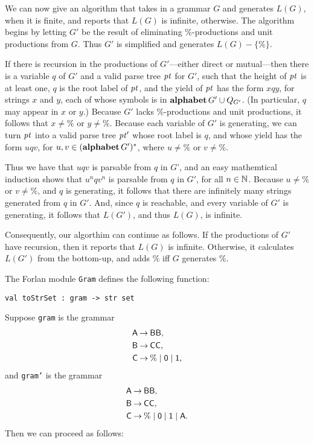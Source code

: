 We can now give an algorithm that takes in a grammar $G$ and generates
$L(G)$, when it is finite, and reports that $L(G)$ is infinite,
otherwise. The algorithm begins by letting $G'$ be the result of
eliminating $\%$-productions and unit productions from $G$. Thus $G'$
is simplified and generates $L(G)-\{\%\}$.

If there is recursion in the productions of $G'$---either direct or
mutual---then there is a variable $q$ of $G'$ and a valid parse tree
${\it pt}$ for $G'$, such that the height of ${\it pt}$ is at least one, $q$ is
the root label of ${\it pt}$, and the yield of ${\it pt}$ has the form $xqy$,
for strings $x$ and $y$, each of whose symbols is in
$\mathbf{alphabet}\,G'\cup Q_{G'}$. (In particular, $q$ may appear in $x$ or
$y$.) Because $G'$ lacks $\%$-productions and unit productions, it
follows that $x\neq\%$ or $y\neq\%$. Because each variable of $G'$ is
generating, we can turn ${\it pt}$ into a valid parse tree ${\it pt}'$ whose
root label is $q$, and whose yield has the form $uqv$, for
$u,v\in(\mathbf{alphabet}\,G')^*$, where $u\neq\%$ or $v\neq\%$.

Thus we have that $uqv$ is parsable from $q$ in $G$', and an easy
mathemtical induction shows that $u^nqv^n$ is parsable from $q$ in
$G'$, for all $n\in\mathbb{N}$.  Because $u\neq\%$ or $v\neq\%$, and $q$ is
generating, it follows that there are infinitely many strings
generated from $q$ in $G'$. And, since $q$ is reachable, and every
variable of $G'$ is generating, it follows that $L(G')$, and thus
$L(G)$, is infinite.

Consequently, our algorthim can continue as follows. If the
productions of $G'$ have recursion, then it reports that $L(G)$ is
infinite.  Otherwise, it calculates $L(G')$ from the bottom-up, and
adds $\%$ iff $G$ generates $\%$.

The Forlan module \texttt{Gram} defines the following function:
\begin{verbatim}
val toStrSet : gram -> str set
\end{verbatim}
Suppose \texttt{gram} is the grammar
\begin{align*}
\mathsf{A} &\mathbin{\to} \mathsf{BB}, \\
\mathsf{B} &\mathbin{\to} \mathsf{CC}, \\
\mathsf{C} &\mathbin{\to} \% \mid \mathsf{0} \mid \mathsf{1} ,
\end{align*}
and
\texttt{gram'} is the grammar
\begin{align*}
\mathsf{A} &\mathbin{\to} \mathsf{BB}, \\
\mathsf{B} &\mathbin{\to} \mathsf{CC}, \\
\mathsf{C} &\mathbin{\to} \% \mid \mathsf{0} \mid \mathsf{1} \mid \mathsf{A} .
\end{align*}
Then we can proceed as follows:
  

